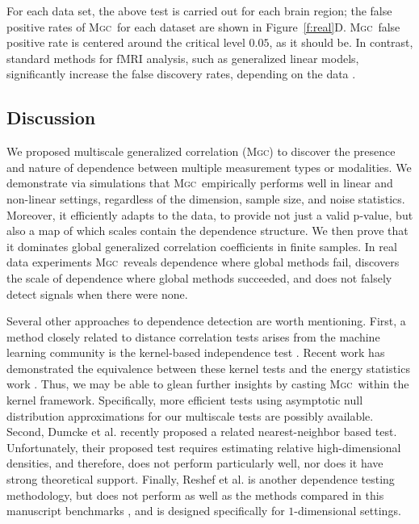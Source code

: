 \documentclass[11pt]{article}
\providecommand{\sct}[1]{{\normalfont\textsc{#1}}}
\newcommand{\Mgc}{\sct{Mgc}}
\begin{document}
For each data set, the above test is carried out for each brain region; the false positive rates of \Mgc~for each dataset are shown in Figure~\ref{f:real}D. %
\Mgc~false positive rate is centered around the critical level $0.05$, as it should be.
In contrast,  standard methods for fMRI analysis, such as generalized linear models, significantly increase the false discovery rates, depending on the data \cite{EklundKnutsson2012,Eklund2015}.

\subsection*{Discussion}
\label{conclu}

We proposed multiscale generalized correlation (\Mgc) to discover the presence and nature of dependence between multiple measurement types or modalities.
We demonstrate via simulations that \Mgc~empirically performs well in linear and non-linear settings, regardless of the dimension, sample size, and noise statistics.  Moreover, it efficiently adapts to the data, to provide not just a valid p-value, but also a map of which scales contain the dependence structure. We then prove that it dominates global generalized correlation coefficients in finite samples.
In real data experiments \Mgc~reveals dependence where global methods fail, discovers the scale of dependence where global methods succeeded, and does not falsely detect signals when there were none.


Several other approaches to dependence detection are worth mentioning.
First, a method closely related to distance correlation tests arises from the machine learning community is the kernel-based independence test  \cite{GrettonEtAl2005, GrettonGyorfi2010, GrettonEtAl2012}.  Recent work has demonstrated the equivalence between these kernel tests and the energy statistics work \cite{SejdinovicEtAl2013, RamdasEtAl2015}. Thus, we may be able to glean further insights by casting \Mgc~within the kernel framework. Specifically, more efficient tests using asymptotic null distribution approximations for our multiscale tests are possibly available.
Second, Dumcke et al. \cite{Dumcke2014} recently proposed a related nearest-neighbor based test.  Unfortunately, their proposed test requires estimating relative high-dimensional densities, and therefore, does not perform particularly well, nor does it have strong theoretical support.
Finally, Reshef et al. \cite{Reshef2011} is another dependence testing methodology, but does not perform as well as the methods compared in this manuscript  benchmarks \cite{SimonTibshirani2012}, and is designed specifically for $1$-dimensional settings.
\end{document}
